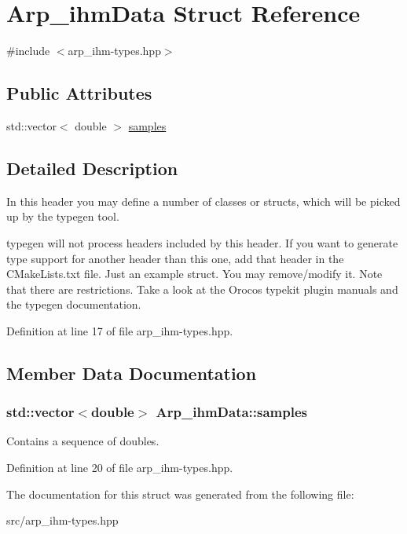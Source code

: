 \hypertarget{structArp__ihmData}{
\section{Arp\_\-ihmData Struct Reference}
\label{structArp__ihmData}
}


{\ttfamily \#include $<$arp\_\-ihm-\/types.hpp$>$}

\subsection*{Public Attributes}
\begin{DoxyCompactItemize}
\item 
std::vector$<$ double $>$ \hyperlink{structArp__ihmData_aef54a17ba3507d0c3fc12f0d8ab908d7}{samples}
\end{DoxyCompactItemize}


\subsection{Detailed Description}
In this header you may define a number of classes or structs, which will be picked up by the typegen tool.

typegen will not process headers included by this header. If you want to generate type support for another header than this one, add that header in the CMakeLists.txt file. Just an example struct. You may remove/modify it. Note that there are restrictions. Take a look at the Orocos typekit plugin manuals and the typegen documentation. 

Definition at line 17 of file arp\_\-ihm-\/types.hpp.



\subsection{Member Data Documentation}
\hypertarget{structArp__ihmData_aef54a17ba3507d0c3fc12f0d8ab908d7}{
\subsubsection[{samples}]{\setlength{\rightskip}{0pt plus 5cm}std::vector$<$double$>$ {\bf Arp\_\-ihmData::samples}}}
\label{structArp__ihmData_aef54a17ba3507d0c3fc12f0d8ab908d7}
Contains a sequence of doubles. 

Definition at line 20 of file arp\_\-ihm-\/types.hpp.



The documentation for this struct was generated from the following file:\begin{DoxyCompactItemize}
\item 
src/arp\_\-ihm-\/types.hpp\end{DoxyCompactItemize}
